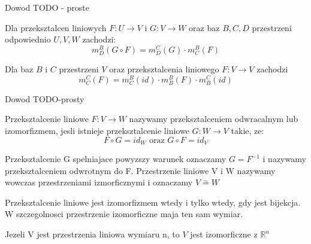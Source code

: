 \documentclass{article}
\begin{document}
Dowod TODO - proste

\vspace{5mm}
\begin{tcolorbox}[colback=white!90!red,colframe=black!35!red,title=Fakt 1.30 Macierz zlozenia przeksztalcen]

Dla przeksztalcen liniowych $F:U \rightarrow V$ i $G: V \rightarrow W$ oraz baz $B,C,D$ przestrzeni odpowiednio $U,V,W$ zachodzi:
$$m_{D}^{B}(G \circ F) = m_{D}^{C}(G)\cdot m_{C}^{B}(F)$$

\end{tcolorbox}
\vspace{5mm}

\begin{tcolorbox}[colback=white!90!red,colframe=black!35!red,title=Wniosek 1.31 Macierz przeksztalcenia w roznych bazach.]

Dla baz $B$ i $C$ przestrzeni $V$ oraz przeksztalcenia liniowego $F: V \rightarrow V$ zachodzi
$$m_{C}^{C}(F) = m_{C}^{B}(id) \cdot m_{B}^{B}(F) \cdot m_{B}^{C}(id) $$

\end{tcolorbox}

\vspace{5mm}
Dowod TODO-prosty
\vspace{5mm}

\begin{tcolorbox}[colback=white!90!red,colframe=black!35!red,title=Definicja 1.32 Izomorfizm]

Przeksztalcenie liniowe $F:V \rightarrow W$ nazywamy przeksztalceniem odwracalnym lub izomorfizmem, jesli istnieje przeksztalcenie liniowe $G:W \rightarrow V$ takie, ze:
$$F \circ G = id_{W} \text{ oraz } G \circ F = id_{V}$$

Przeksztalcenie G spelniajace powyzszy warunek oznaczamy $G=F^{-1}$ i nazywamy przeksztalceniem odwrotnym do F. Przestrzenie liniowe V i W nazywamy wowczas przestrzeniami izmorficznymi i oznaczamy $V \overset{\sim}{=} W$

\end{tcolorbox}
 
\begin{tcolorbox}[colback=white!90!red,colframe=black!35!red,title=Fakt 1.33-4 Izomorfizm i uniwersalnosc $\mathbb{R}^{n}$]

Przeksztalcenie liniowe jest izomorfizmem wtedy i tylko wtedy, gdy jest bijekcja. W szczegolnosci przestrzenie izomorficzne maja ten sam wymiar. 

Jezeli V jest przestrzenia liniowa wymiaru n, to $V$ jest izomorficzne z $\mathbb{R}^{n}$

\end{tcolorbox}
\end{document}
